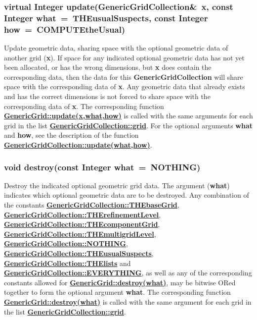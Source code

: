 \documentclass{article}
\begin{document}
  \subsubsection{virtual Integer update(GenericGridCollection\&~x, const Integer what~=~THEusualSuspects, const Integer how~=~COMPUTEtheUsual)}
  \label{GenericGridCollection::update(x,what,how)}
    Update geometric data, sharing space with the optional geometric data of another grid (\textbf{x}).
    If space for any indicated optional geometric data has not yet been allocated, or has
    the wrong dimensions, but \textbf{x} does contain the corresponding data, then the data
    for this \textbf{GenericGridCollection} will share space with the corresponding data of \textbf{x}.
    Any geometric data that already exists and has the correct dimensions
    is not forced to share space with the corresponding data of \textbf{x}.
    The corresponding function
    {\bf{}\hyperref{update(x,what,how)}{update(x,what,how) \rm(\S}{)}{GenericGrid::update(x,what,how)}}
    is called with the same arguments for each grid in the list
    {\bf{}\hyperref{grid}{grid \rm(\S}{)}{GenericGridCollection::grid}}.
    For the optional arguments \textbf{what} and \textbf{how}, see the description of the function
    {\bf{}\hyperref{update(what,how)}{update(what,how) \rm(\S}{)}{GenericGridCollection::update(what,how)}}.

  \subsubsection{void destroy(const Integer what~=~NOTHING)}
  \label{GenericGridCollection::destroy(what)}
    Destroy the indicated optional geometric grid data.
    The argument (\textbf{what}) indicates which optional
    geometric data are to be destroyed.  Any combination of the constants
    {\bf{}\hyperref{THEbaseGrid}{THEbaseGrid \rm(\S}{)}{GenericGridCollection::THEbaseGrid}},
    {\bf{}\hyperref{THErefinementLevel}{THErefinementLevel \rm(\S}{)}{GenericGridCollection::THErefinementLevel}},
    {\bf{}\hyperref{THEcomponentGrid}{THEcomponentGrid \rm(\S}{)}{GenericGridCollection::THEcomponentGrid}},
    {\bf{}\hyperref{THEmultigridLevel}{THEmultigridLevel \rm(\S}{)}{GenericGridCollection::THEmultigridLevel}},
    {\bf{}\hyperref{NOTHING}{NOTHING \rm(\S}{)}{GenericGridCollection::NOTHING}},
    {\bf{}\hyperref{THEusualSuspects}{THEusualSuspects \rm(\S}{)}{GenericGridCollection::THEusualSuspects}},
    {\bf{}\hyperref{THElists}{THElists \rm(\S}{)}{GenericGridCollection::THElists}} and
    {\bf{}\hyperref{EVERYTHING}{EVERYTHING \rm(\S}{)}{GenericGridCollection::EVERYTHING}},
    as well as any of the corresponding constants allowed for
    {\bf{}\hyperref{GenericGrid::destroy(what)}{GenericGrid::destroy(what) \rm(\S}{)}{GenericGrid::destroy(what)}},
    may be bitwise ORed together to form the optional argument \textbf{what}.
    The corresponding function
    {\bf{}\hyperref{destroy(what)}{destroy(what) \rm(\S}{)}{GenericGrid::destroy(what)}}
    is called with the same argument for each grid in the list
    {\bf{}\hyperref{grid}{grid \rm(\S}{)}{GenericGridCollection::grid}}.
\end{document}
